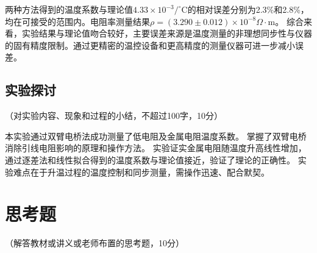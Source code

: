 \documentclass[10pt,a4paper]{ctexart}
\newcommand{\myspace}[1]{\par\vspace{#1\baselineskip}} %
\newcommand{\xiaosi}{\fontsize{12pt}{16pt}\selectfont}
\begin{document}
    两种方法得到的温度系数与理论值$4.33 \times 10^{-3} /^\circ\mathrm{C}$的相对误差分别为2.3\%和2.8\%，均在可接受的范围内。电阻率测量结果$\rho = (3.290 \pm 0.012) \times 10^{-8} \Omega\cdot\mathrm{m}$。
    综合来看，实验结果与理论值吻合较好，主要误差来源是温度测量的非理想同步性与仪器的固有精度限制。通过更精密的温控设备和更高精度的测量仪器可进一步减小误差。
    
    \myspace{2}
    
    \subsection{实验探讨}
    \xiaosi （对实验内容、现象和过程的小结，不超过100字，10分）
    
    本实验通过双臂电桥法成功测量了低电阻及金属电阻温度系数。
    掌握了双臂电桥消除引线电阻影响的原理和操作方法。
    实验证实金属电阻随温度升高线性增加，通过逐差法和线性拟合得到的温度系数与理论值接近，验证了理论的正确性。
    实验难点在于升温过程的温度控制和同步测量，需操作迅速、配合默契。

\section{思考题}

    \xiaosi （解答教材或讲义或老师布置的思考题，10分）
    
\end{document}
